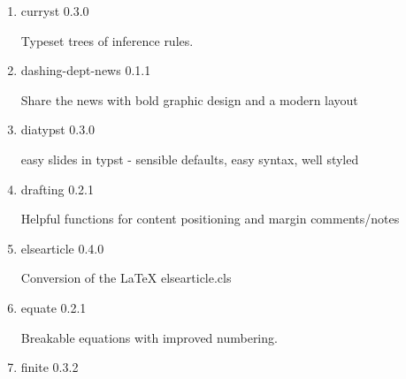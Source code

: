 \begin{enumerate}
  { cram-snap } { 0.2.1 }

  Typst template for creating cheatsheets

  { }
\item
  \href{/universe/package/curryst/}{}

  { curryst } { 0.3.0 }

  Typeset trees of inference rules.

  { }
\item
  \href{/universe/package/dashing-dept-news/}{}


  { dashing-dept-news } { 0.1.1 }

  Share the news with bold graphic design and a modern layout

  { }
\item
  \href{/universe/package/diatypst/}{}


  { diatypst } { 0.3.0 }

  easy slides in typst - sensible defaults, easy syntax, well styled

  { }
\item
  \href{/universe/package/drafting/}{}

  { drafting } { 0.2.1 }

  Helpful functions for content positioning and margin comments/notes

  { }
\item
  \href{/universe/package/elsearticle/}{}


  { elsearticle } { 0.4.0 }

  Conversion of the LaTeX elsearticle.cls

  { }
\item
  \href{/universe/package/equate/}{}

  { equate } { 0.2.1 }

  Breakable equations with improved numbering.

  { }
\item
  \href{/universe/package/finite/}{}

  { finite } { 0.3.2 }


\end{enumerate}
